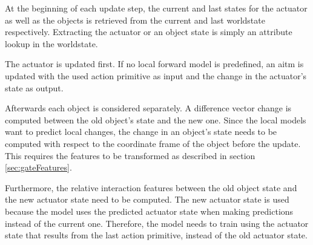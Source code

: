 %	

At the beginning of each update step, the current and last states for the actuator as well as the objects is retrieved from the current and last worldstate respectively.
Extracting the actuator or an object state is simply an attribute lookup in the worldstate. 

The actuator is updated first. If no local forward model is predefined, an \gls{aitm} is updated with the used action primitive as input and the change in the actuator's state as output.

Afterwards each object is considered separately. A difference vector change is computed between the old object's state and the new one. Since the local models want to predict local changes, the change in an object's state needs to be computed with respect to the coordinate frame of the object before the update. This requires the features to be transformed as described in section \ref{sec:gateFeatures}.

Furthermore, the relative interaction features between the old object state and the new actuator state need to be computed. The new actuator state is used because the model uses the predicted actuator state when making predictions instead of the current one. Therefore, the model needs to train using the actuator state that results from the last action primitive, instead of the old actuator state.

